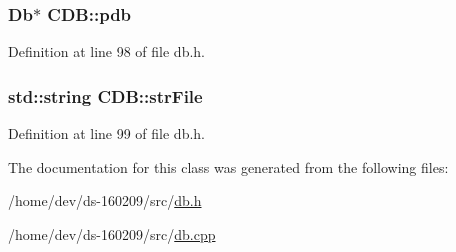 \subsubsection[{pdb}]{\setlength{\rightskip}{0pt plus 5cm}Db$\ast$ C\+D\+B\+::pdb\hspace{0.3cm}{\ttfamily [protected]}}\label{class_c_d_b_a4520f55d31246fc06d80f72b5dd62253}


Definition at line 98 of file db.\+h.

\hypertarget{class_c_d_b_a15c6112d9db9dcc5f11a2c05d9aa74a5}{}
\subsubsection[{str\+File}]{\setlength{\rightskip}{0pt plus 5cm}std\+::string C\+D\+B\+::str\+File\hspace{0.3cm}{\ttfamily [protected]}}\label{class_c_d_b_a15c6112d9db9dcc5f11a2c05d9aa74a5}


Definition at line 99 of file db.\+h.



The documentation for this class was generated from the following files\+:\begin{DoxyCompactItemize}
\item 
/home/dev/ds-\/160209/src/\hyperlink{db_8h}{db.\+h}\item 
/home/dev/ds-\/160209/src/\hyperlink{db_8cpp}{db.\+cpp}\end{DoxyCompactItemize}
